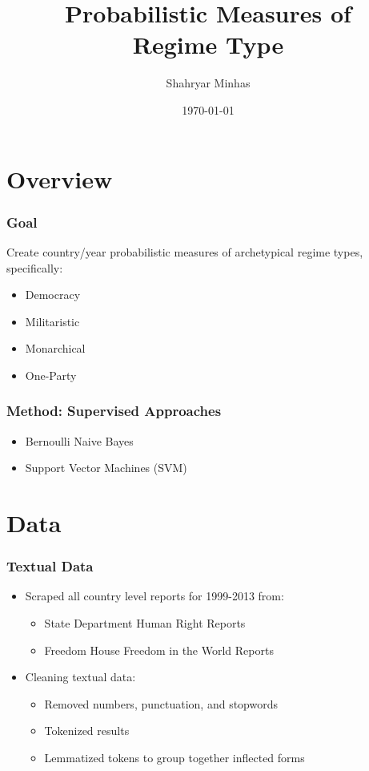 \documentclass{beamer}
\title[Regime Classification \hspace{14em} \insertframenumber/
\inserttotalframenumber]{Probabilistic Measures of \\ Regime Type}
\author{Shahryar Minhas}
\institute[Duke University]
{
{\emph{sfm12@duke.edu}} \\
\medskip
Duke University 
}
\date{\today}
\begin{document}
\begin{frame}
\titlepage
\end{frame}

\section{Overview}

\begin{frame}
\frametitle{Goal}

Create country/year probabilistic measures of archetypical regime types, specifically:

\begin{itemize}
	\item Democracy
	\item Militaristic	
	\item Monarchical
	\item One-Party
\end{itemize}

\end{frame}

\begin{frame}
\frametitle{Method: Supervised Approaches}

\begin{itemize}
	\item Bernoulli Naive Bayes
	\item Support Vector Machines (SVM)
\end{itemize}

\end{frame}

\section{Data}

\begin{frame}
\frametitle{Textual Data}

\begin{itemize}
	\item Scraped all country level reports for 1999-2013 from: 
		\begin{itemize}
			\item State Department Human Right Reports
			\item Freedom House Freedom in the World Reports
		\end{itemize}
	\item Cleaning textual data:
		\begin{itemize}
			\item Removed numbers, punctuation, and stopwords
			\item Tokenized results
			\item Lemmatized tokens to group together inflected forms
		\end{itemize}
\end{itemize}

\end{frame}
\end{document}
